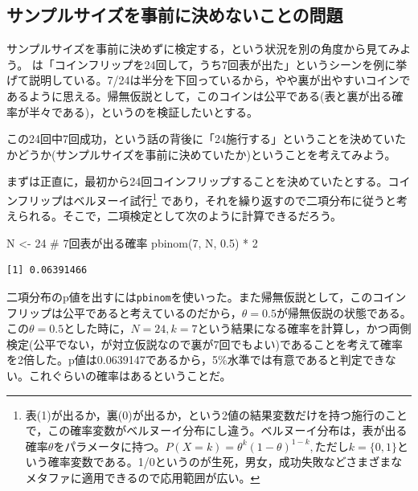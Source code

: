 \documentclass[
  a4paper,
]{ltjsbook}
\newenvironment{Shaded}{\begin{snugshade}}{\end{snugshade}}
\newcommand{\CommentTok}[1]{\textcolor[rgb]{0.37,0.37,0.37}{#1}}
\newcommand{\DecValTok}[1]{\textcolor[rgb]{0.68,0.00,0.00}{#1}}
\newcommand{\FloatTok}[1]{\textcolor[rgb]{0.68,0.00,0.00}{#1}}
\newcommand{\FunctionTok}[1]{\textcolor[rgb]{0.28,0.35,0.67}{#1}}
\newcommand{\NormalTok}[1]{\textcolor[rgb]{0.00,0.23,0.31}{#1}}
\newcommand{\OtherTok}[1]{\textcolor[rgb]{0.00,0.23,0.31}{#1}}
\newcommand{\SpecialCharTok}[1]{\textcolor[rgb]{0.37,0.37,0.37}{#1}}
\begin{document}
\subsection{サンプルサイズを事前に決めないことの問題}\label{ux30b5ux30f3ux30d7ux30ebux30b5ux30a4ux30baux3092ux4e8bux524dux306bux6c7aux3081ux306aux3044ux3053ux3068ux306eux554fux984c}

サンプルサイズを事前に決めずに検定する，という状況を別の角度から見てみよう。\textcite{Maeda2017}
は「コインフリップを24回して，うち7回表が出た」というシーンを例に挙げて説明している。7/24は半分を下回っているから，やや裏が出やすいコインであるように思える。帰無仮説として，このコインは公平である(表と裏が出る確率が半々である)，というのを検証したいとする。

この24回中7回成功，という話の背後に「24施行する」ということを決めていたかどうか(サンプルサイズを事前に決めていたか)ということを考えてみよう。

まずは正直に，最初から24回コインフリップすることを決めていたとする。コインフリップはベルヌーイ試行\footnote{表(1)が出るか，裏(0)が出るか，という2値の結果変数だけを持つ施行のことで，この確率変数がベルヌーイ分布にし違う。ベルヌーイ分布は，表が出る確率\(\theta\)をパラメータに持つ。\(P(X=k) = \theta^k(1-\theta)^{1-k},\text{ただし}k=\{0,1\}\)という確率変数である。1/0というのが生死，男女，成功失敗などさまざまなメタファに適用できるので応用範囲が広い。}
であり，それを繰り返すので二項分布に従うと考えられる。そこで，二項検定として次のように計算できるだろう。

\begin{Shaded}
\begin{Highlighting}[]
\NormalTok{N }\OtherTok{\textless{}{-}} \DecValTok{24}
\CommentTok{\# 7回表が出る確率}
\FunctionTok{pbinom}\NormalTok{(}\DecValTok{7}\NormalTok{, N, }\FloatTok{0.5}\NormalTok{) }\SpecialCharTok{*} \DecValTok{2}
\end{Highlighting}
\end{Shaded}

\begin{verbatim}
[1] 0.06391466
\end{verbatim}

二項分布のp値を出すには\texttt{pbinom}を使いった。また帰無仮説として，このコインフリップは公平であると考えているのだから，\(\theta=0.5\)が帰無仮説の状態である。この\(\theta=0.5\)とした時に，\(N=24,k=7\)という結果になる確率を計算し，かつ両側検定(公平でない，が対立仮説なので裏が7回でもよい)であることを考えて確率を2倍した。p値は0.0639147であるから，5\%水準では有意であると判定できない。これぐらいの確率はあるということだ。
\end{document}
